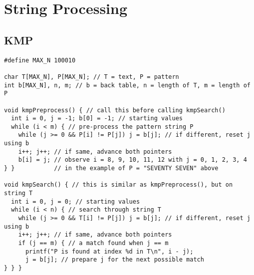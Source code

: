 \documentclass[letterpaper]{article}
\begin{document}
\section{String Processing}
\subsection{KMP}
\begin{lstlisting}
#define MAX_N 100010

char T[MAX_N], P[MAX_N]; // T = text, P = pattern
int b[MAX_N], n, m; // b = back table, n = length of T, m = length of P

void kmpPreprocess() { // call this before calling kmpSearch()
  int i = 0, j = -1; b[0] = -1; // starting values
  while (i < m) { // pre-process the pattern string P
    while (j >= 0 && P[i] != P[j]) j = b[j]; // if different, reset j using b
    i++; j++; // if same, advance both pointers
    b[i] = j; // observe i = 8, 9, 10, 11, 12 with j = 0, 1, 2, 3, 4
} }           // in the example of P = "SEVENTY SEVEN" above

void kmpSearch() { // this is similar as kmpPreprocess(), but on string T
  int i = 0, j = 0; // starting values
  while (i < n) { // search through string T
    while (j >= 0 && T[i] != P[j]) j = b[j]; // if different, reset j using b
    i++; j++; // if same, advance both pointers
    if (j == m) { // a match found when j == m
      printf("P is found at index %d in T\n", i - j);
      j = b[j]; // prepare j for the next possible match
} } }
\end{lstlisting}
\end{document}
